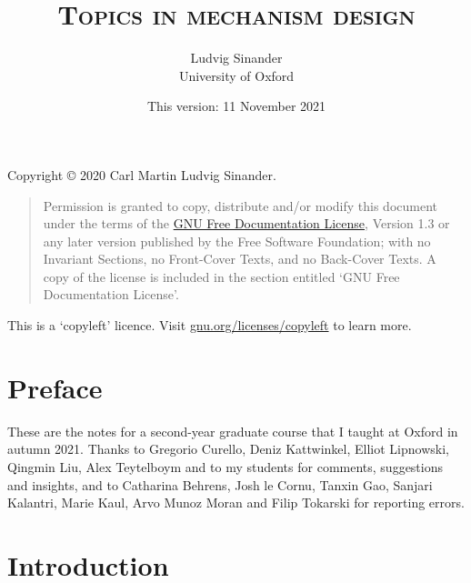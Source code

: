 \documentclass[11pt,letterpaper,reqno,oneside]{book}
\title{\scshape Topics in mechanism design}
\author{Ludvig Sinander \\
University of Oxford}
\date{\small This version: 11 November 2021}
\begin{document}
\maketitle

\pagebreak
\hspace{1pt}\vfill
\noindent
Copyright \copyright{} 2020 Carl Martin Ludvig Sinander.

\begin{quotation}
\noindent
Permission is granted to copy, distribute and/or modify this document under the terms of the \href{https://www.gnu.org/licenses/fdl}{GNU Free Documentation License}, Version 1.3 or any later version published by the Free Software Foundation; with no Invariant Sections, no Front-Cover Texts, and no Back-Cover Texts. A copy of the license is included in the section entitled `GNU
Free Documentation License'.
\end{quotation}

\noindent
This is a `copyleft' licence.
Visit \href{https://www.gnu.org/licenses/copyleft}{gnu.org/licenses/copyleft} to learn more.



\chapter*{Preface}
\label{preface}

These are the notes for a second-year graduate course that I taught at Oxford in autumn 2021.
Thanks to Gregorio Curello, Deniz Kattwinkel, Elliot Lipnowski, Qingmin Liu, Alex Teytelboym and to my students for comments, suggestions and insights,
and to Catharina Behrens, Josh le Cornu, Tanxin Gao, Sanjari Kalantri, Marie Kaul, Arvo Munoz Moran and Filip Tokarski for reporting errors.



\pagebreak
{}
\setcounter{tocdepth}{1}
\tableofcontents
{}



\setcounter{chapter}{-1}
\chapter{Introduction}
\label{ch0}
\end{document}
